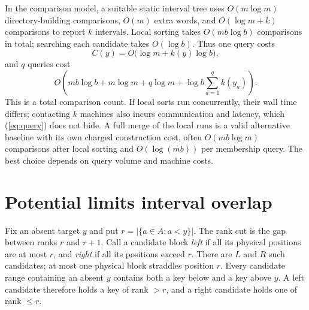 \documentclass[10pt,letterpaper]{article}
\begin{document}
In the comparison model, a suitable static interval tree uses $O(m\log m)$ directory-building comparisons, $O(m)$ extra words, and $O(\log m+k)$ comparisons to report $k$ intervals. Local sorting takes $O(mb\log b)$ comparisons in total; searching each candidate takes $O(\log b)$. Thus one query costs
\begin{equation}\label{eq:query}
 C(y)=O\bigl(\log m+k(y)\log b\bigr),
\end{equation}
and $q$ queries cost
\begin{equation}\label{eq:batch}
 O\left(mb\log b+m\log m+q\log m+\log b\sum_{a=1}^{q}k(y_a)\right).
\end{equation}
This is a total comparison count. If local sorts run concurrently, their wall time differs; contacting $k$ machines also incurs communication and latency, which (\ref{eq:query}) does not hide. A full merge of the local runs is a valid alternative baseline with its own charged construction cost, often $O(mb\log m)$ comparisons after local sorting and $O(\log(mb))$ per membership query. The best choice depends on query volume and machine costs.

\section{Potential limits interval overlap}
Fix an absent target $y$ and put $r=|\{a\in A:a<y\}|$. The rank cut is the gap between ranks $r$ and $r+1$. Call a candidate block \emph{left} if all its physical positions are at most $r$, and \emph{right} if all its positions exceed $r$. There are $L$ and $R$ such candidates; at most one physical block straddles position $r$. Every candidate range containing an absent $y$ contains both a key below and a key above $y$. A left candidate therefore holds a key of rank $>r$, and a right candidate holds one of rank $\le r$.
\end{document}

